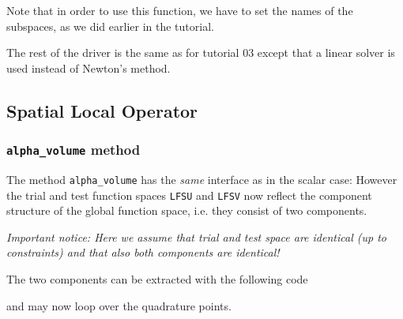 \documentclass[a4paper,12pt]{article}
\theoremstyle{definition}
\theoremstyle{definition}
\begin{document}
% 

% 
Note that in order to use this function, we have to set the names of the subspaces,
as we did earlier in the tutorial.

The rest of the driver is the same as for tutorial 03 except that
a linear solver is used instead of Newton's method.

\subsection{Spatial Local Operator}


\subsubsection*{\lstinline{alpha_volume} method}

The method \lstinline{alpha_volume} has the \textit{same} interface
as in the scalar case:
%
However the trial and test function spaces \lstinline{LFSU} and \lstinline{LFSV}
now reflect the component structure of the global function space, i.e.
they consist of two components.

\textit{Important notice: Here we assume that trial and test space are identical
(up to constraints) and that also both components are identical!}

The two components can be extracted with the following code



and may now loop over the quadrature points.
\end{document}

